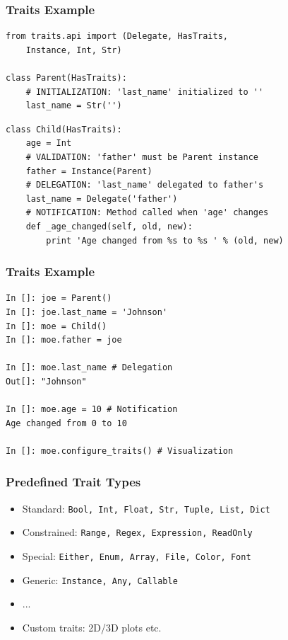 \documentclass[14pt,compress]{beamer}
\newcounter{time}
\newcommand{\inctime}[1]{\addtocounter{time}{#1}{\tiny \thetime\ m}}
\newcommand{\typ}[1]{\lstinline{#1}}
\begin{document}
\begin{frame}
  \frametitle{Traits Example}
\vspace*{-16pt}
\footnotesize
\begin{lstlisting}
from traits.api import (Delegate, HasTraits, 
    Instance, Int, Str)

class Parent(HasTraits):
    # INITIALIZATION: 'last_name' initialized to ''
    last_name = Str('') 
\end{lstlisting}
\pause
\begin{lstlisting}
class Child(HasTraits):
    age = Int
    # VALIDATION: 'father' must be Parent instance
    father = Instance(Parent)
    # DELEGATION: 'last_name' delegated to father's 
    last_name = Delegate('father') 
    # NOTIFICATION: Method called when 'age' changes
    def _age_changed(self, old, new): 
        print 'Age changed from %s to %s ' % (old, new)
\end{lstlisting}
\end{frame}

\begin{frame}
  \frametitle{Traits Example}
\vspace*{-6pt}
\small
\begin{lstlisting}
In []: joe = Parent()
In []: joe.last_name = 'Johnson'
In []: moe = Child()
In []: moe.father = joe

In []: moe.last_name # Delegation
Out[]: "Johnson"

In []: moe.age = 10 # Notification
Age changed from 0 to 10

In []: moe.configure_traits() # Visualization
\end{lstlisting}
\inctime{10}
\end{frame}


\begin{frame}
    \frametitle{Predefined Trait Types}
    \vspace*{-6pt}
    \small
    \begin{itemize}
        \item Standard: \typ{Bool, Int, Float, Str, Tuple, List, Dict}
        \item Constrained: \typ{Range, Regex, Expression, ReadOnly}
        \item Special: \typ{Either, Enum, Array, File, Color, Font}
        \item Generic: \typ{Instance, Any, Callable}
        \item ...
        \item Custom traits: 2D/3D plots etc.
    \end{itemize}
\end{frame}
\end{document}
